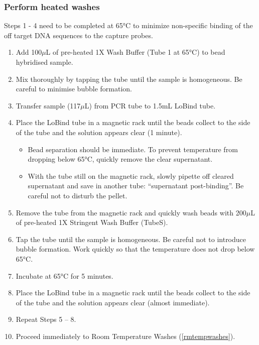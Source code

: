 \subsubsection{Perform heated washes} 
\label{heatedwashes}
Steps 1 - 4 need to be completed at 65°C to minimize non-specific binding of the off target DNA sequences to the capture probes. 
\begin{enumerate}
	\item Add 100$\mu$L of pre-heated 1X Wash Buffer (Tube 1 at 65°C) to bead hybridised sample. 
	\item Mix thoroughly by tapping the tube until the sample is homogeneous. Be careful to minimise bubble formation. 
	\item Transfer sample (117$\mu$L) from PCR tube to 1.5mL LoBind tube.
	\item Place the LoBind tube in a magnetic rack until the beads collect to the side of the tube and the solution appears clear (1 minute).
	\begin{itemize}
		\item Bead separation should be immediate. To prevent temperature from dropping below 65°C, quickly remove the clear supernatant.
		\item With the tube still on the magnetic rack, slowly pipette off cleared supernatant and save in another tube: “supernatant post-binding”. Be careful not to disturb the pellet.
	\end{itemize} 
	\item Remove the tube from the magnetic rack and quickly wash beads with 200$\mu$L of pre-heated 1X Stringent Wash Buffer (TubeS).
	\item Tap the tube until the sample is homogeneous. Be careful not to introduce bubble formation. Work quickly so that the temperature does not drop below 65°C.
	\item Incubate at 65°C for 5 minutes.
	\item Place the LoBind tube in a magnetic rack until the beads collect to the side of the tube and the solution appears clear (almost immediate). 
	\item Repeat Steps 5 – 8.
	\item Proceed immediately to Room Temperature Washes (\cref{rmtempwashes}).
\end{enumerate} 

